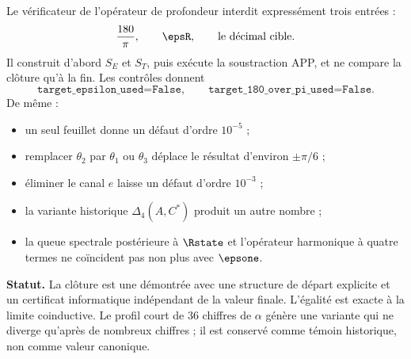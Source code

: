 Le vérificateur de l'opérateur de profondeur interdit expressément trois entrées :
\[
\frac{180}{\pi},\qquad \epsR,\qquad
\text{le décimal cible}.
\]
Il construit d'abord \(S_E\) et \(S_T\), puis exécute la soustraction APP, et ne
compare la clôture qu'à la fin. Les contrôles donnent
\[
\texttt{target\_epsilon\_used=False},\qquad
\texttt{target\_180\_over\_pi\_used=False}.
\]
De même :
\begin{itemize}
\item un seul feuillet donne un défaut d'ordre \(10^{-5}\) ;
\item remplacer \(\theta_2\) par \(\theta_1\) ou \(\theta_3\) déplace le
résultat d'environ \(\pm\pi/6\) ;
\item éliminer le canal \(e\) laisse un défaut d'ordre \(10^{-3}\) ;
\item la variante historique \(\Delta_4(A,C^*)\) produit un autre nombre ;
\item la queue spectrale postérieure à \(\Rstate\) et l'opérateur harmonique à
quatre termes ne coïncident pas non plus avec \(\epsone\).
\end{itemize}

\begin{statusbox}
\textbf{Statut.} La clôture est une  démontrée
avec une structure de départ explicite et un certificat informatique indépendant de la valeur finale.
L'égalité est exacte à la limite coinductive. Le profil court de 36 chiffres
de \(\alpha\) génère une variante qui ne diverge qu'après de nombreux chiffres ;
il est conservé comme témoin historique, non comme valeur canonique.
\end{statusbox}

